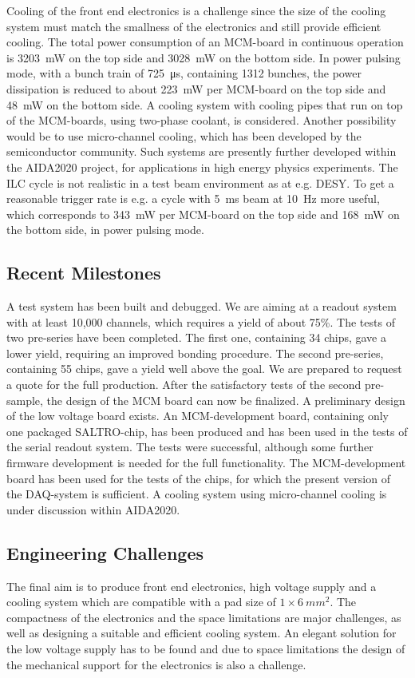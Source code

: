 Cooling of the front end electronics is a challenge since the size of the cooling system must match the smallness of the electronics and still provide efficient cooling. The total power consumption of an MCM-board in continuous operation
is \SI{3203}{mW} on the top side and \SI{3028}{mW} on the bottom side. In power pulsing mode, with a bunch train of \SI{725}{\micro s}, containing 1312 bunches, the power dissipation is reduced to about \SI{223}{mW} per MCM-board on the top side and \SI{48}{mW} on the bottom side. A cooling system with cooling pipes that run on top of the MCM-boards, using two-phase  coolant, is considered. Another possibility would be to use micro-channel cooling, which has been developed by the semiconductor community. Such systems are presently further developed within the AIDA2020 project, for applications in high energy physics experiments. The ILC cycle is not realistic in a test beam environment as at e.g. DESY. To get a reasonable trigger rate is e.g. a cycle with \SI{5}{ms} beam at \SI{10}{Hz} more useful, which corresponds to \SI{343}{mW} per MCM-board on the top side and \SI{168}{mW} on the bottom side, in power pulsing mode.

\subsection{Recent Milestones}
A test system has been built and debugged. We are aiming at a readout system with at least 10,000 channels, which requires a yield of about 75\%. The tests of two pre-series have been completed. The first one, containing 34 chips, gave a lower yield, requiring an improved bonding procedure. The second pre-series, containing 55 chips, gave a yield well above the goal. We are prepared to request a quote for the full production. After the satisfactory tests of the second pre-sample, the design of the MCM board can now be finalized. A preliminary design of the low voltage board exists. An MCM-development board, containing only one packaged SALTRO-chip, has been produced and has been used in the tests of the serial readout system. The tests were successful, although some further firmware development is needed for the full functionality. The MCM-development board has been used for the tests of the chips, for which the present version of the DAQ-system is sufficient. A cooling system using micro-channel cooling is under discussion within AIDA2020.

\subsection{Engineering Challenges}
The final aim is to produce front end electronics, high voltage supply and a cooling system which are compatible with a pad size of $1 \times \SI{6}{mm^2}$. The compactness of the electronics and the space limitations are major challenges, as well as designing a suitable and efficient cooling system. An elegant solution for the low voltage supply has to be found and due to space limitations the design of the mechanical support for the electronics is also a challenge.

